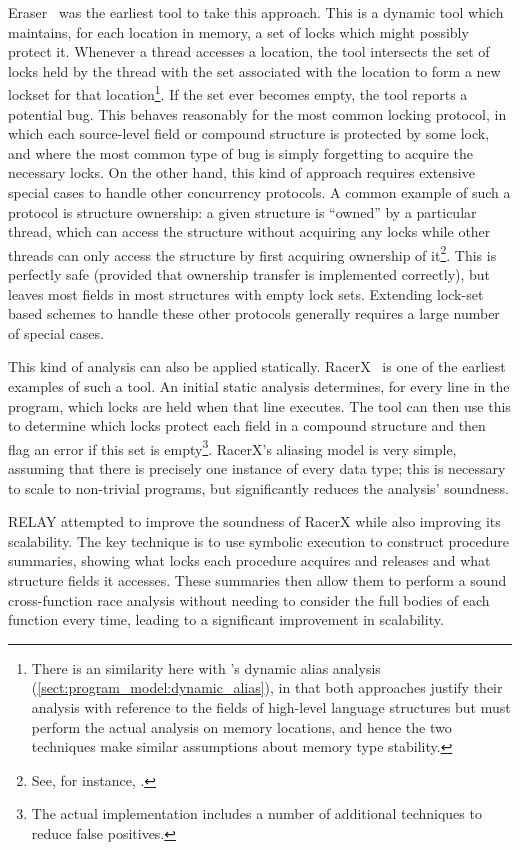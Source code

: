 Eraser~\cite{Savage1997} was the earliest tool to take this approach.
This is a dynamic tool which maintains, for each location in memory, a
set of locks which might possibly protect it.  Whenever a thread
accesses a location, the tool intersects the set of locks held by the
thread with the set associated with the location to form a new lockset
for that location\footnote{There is an similarity here with
  {\technique}'s dynamic alias analysis
  (\autoref{sect:program_model:dynamic_alias}), in that both
  approaches justify their analysis with reference to the fields of
  high-level language structures but must perform the actual analysis
  on memory locations, and hence the two techniques make similar
  assumptions about memory type stability.}.  If the set ever becomes
empty, the tool reports a potential bug.  This behaves reasonably for
the most common locking protocol, in which each source-level field or
compound structure is protected by some lock, and where the most
common type of bug is simply forgetting to acquire the necessary
locks.  On the other hand, this kind of approach requires extensive
special cases to handle other concurrency protocols.  A common example
of such a protocol is structure ownership: a given structure is
``owned'' by a particular thread, which can access the structure
without acquiring any locks while other threads can only access the
structure by first acquiring ownership of it\footnote{See, for
  instance, \cite{Spear2007}.}.  This is perfectly safe (provided that
ownership transfer is implemented correctly), but leaves most fields
in most structures with empty lock sets.  Extending lock-set based
schemes to handle these other protocols generally requires a large
number of special cases.

This kind of analysis can also be applied statically.
RacerX~\cite{Engler2003} is one of the earliest examples of such a
tool.  An initial static analysis determines, for every line in the
program, which locks are held when that line executes.  The tool can
then use this to determine which locks protect each field in a
compound structure and then flag an error if this set is
empty\footnote{The actual implementation includes a number of
  additional techniques to reduce false positives.}.  RacerX's
aliasing model is very simple, assuming that there is precisely one
instance of every data type; this is necessary to scale to non-trivial
programs, but significantly reduces the analysis' soundness.

RELAY\cite{Voung2007} attempted to improve the soundness of RacerX
while also improving its scalability.  The key technique is to use
symbolic execution to construct procedure summaries\cite{Qadeer2004},
showing what locks each procedure acquires and releases and what
structure fields it accesses.  These summaries then allow them to
perform a sound cross-function race analysis without needing to
consider the full bodies of each function every time, leading to a
significant improvement in scalability.

